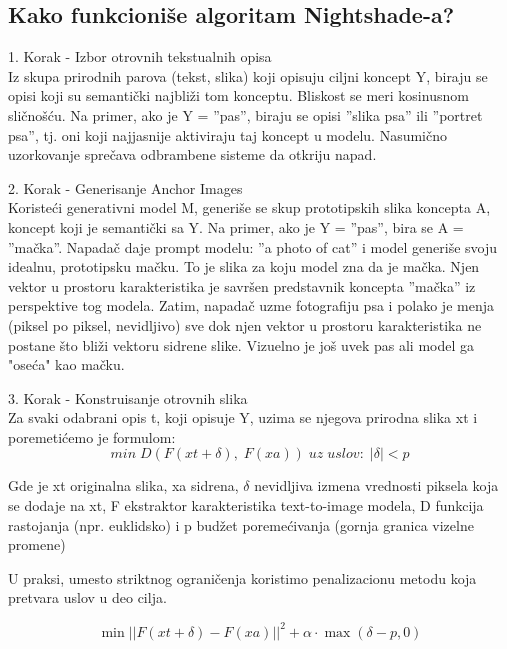     

\subsection{Kako funkcioniše algoritam Nightshade-a?}
    1. Korak - Izbor otrovnih tekstualnih opisa\\
    Iz skupa prirodnih parova (tekst, slika) koji opisuju ciljni koncept Y, biraju se opisi koji su semantički najbliži tom konceptu. Bliskost se meri kosinusnom sličnošću. Na primer, ako je Y = ''pas'', biraju se opisi ''slika psa'' ili ''portret psa'', tj. oni koji najjasnije aktiviraju taj koncept u modelu. Nasumično uzorkovanje sprečava odbrambene sisteme da otkriju napad. 

    2. Korak - Generisanje Anchor Images\\
    Koristeći generativni model M, generiše se skup prototipskih slika koncepta A, koncept koji je semantički  sa Y. Na primer, ako je Y = ''pas'', bira se A = ''mačka''. Napadač daje prompt modelu: ''a photo of cat'' i model generiše svoju idealnu, prototipsku mačku. To je slika za koju model zna da je mačka. Njen vektor u prostoru karakteristika je savršen predstavnik koncepta ''mačka'' iz perspektive tog modela.
    Zatim, napadač uzme fotografiju psa i polako je menja (piksel po piksel, nevidljivo) sve dok njen vektor u prostoru karakteristika ne postane što bliži vektoru sidrene slike. Vizuelno je još uvek pas ali model ga "oseća" kao mačku.

    3. Korak - Konstruisanje otrovnih slika\\
    Za svaki odabrani opis t, koji opisuje Y, uzima se njegova prirodna slika xt i poremetićemo je formulom:
    \begin{equation}
        min \; D( F(xt + \delta),  \;F(xa) )\; uz \;uslov: \; |\delta| < p
    \end{equation}
    
    Gde je xt originalna slika, xa sidrena, $\delta$ nevidljiva izmena vrednosti piksela koja se dodaje na xt, F ekstraktor karakteristika text-to-image modela, D funkcija rastojanja (npr. euklidsko) i p budžet poremećivanja (gornja granica vizelne promene)

    U praksi, umesto striktnog ograničenja koristimo penalizacionu metodu koja pretvara uslov u deo cilja.
    
    \begin{equation}
       \min ||F(xt + \delta) - F(xa)||^2 + \alpha \cdot \max(\delta - p, 0) 
    \end{equation}
    
